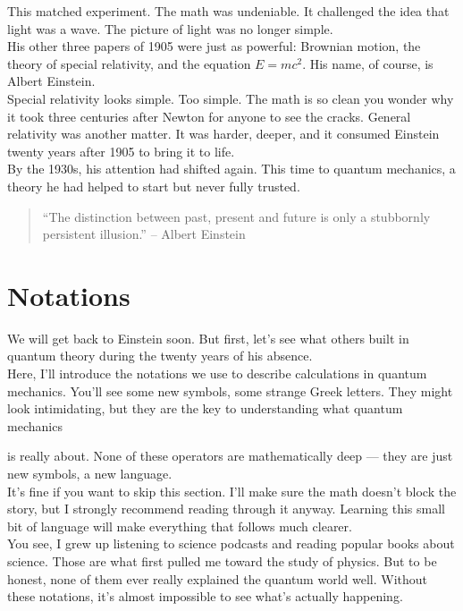 \documentclass{article}
\begin{document}
This matched experiment. The math was undeniable. It challenged the idea 
that light was a wave. The picture of light was no longer simple.\\

His other three papers of 1905 were just as powerful: Brownian motion, 
the theory of special relativity, and the equation $E = mc^2$. 
His name, of course, is Albert Einstein.\\

Special relativity looks simple. Too simple. The math is so clean you wonder why it took three centuries after Newton for anyone to see the cracks. General relativity was another matter. It was harder, deeper, and it consumed Einstein twenty years after 1905 to bring it to life.\\

By the 1930s, his attention had shifted again. This time to quantum mechanics, 
a theory he had helped to start but never fully trusted.

\begin{quote}
``The distinction between past, present and future is only a stubbornly persistent illusion.'' -- Albert Einstein
\end{quote}

\section{Notations}
We will get back to Einstein soon. But first, let’s see what others built in quantum theory 
during the twenty years of his absence.\\

Here, I’ll introduce the notations we use to describe calculations in quantum mechanics. 
You’ll see some new symbols, some strange Greek letters. 
They might look intimidating, but they are the key to understanding what quantum mechanics 

is really about. None of these operators are mathematically deep — they are just 
new symbols, a new language.\\

It’s fine if you want to skip this section. 
I’ll make sure the math doesn’t block the story, 
but I strongly recommend reading through it anyway. 
Learning this small bit of language will make everything that follows much clearer.\\

You see, I grew up listening to science podcasts and reading popular books about science. 
Those are what first pulled me toward the study of physics. 
But to be honest, none of them ever really explained the quantum world well. 
Without these notations, it’s almost impossible to see what’s actually happening.\\
\end{document}

